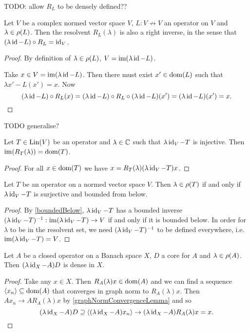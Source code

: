 TODO: allow $R_L$ to be densely defined??

\begin{lemma}
Let $V$ be a complex normed vector space $V$, $L: V\not\to V$ an operator on $V$ and $\lambda\in\rho(L)$. Then the resolvent $R_L(\lambda)$ is also a right inverse, in the sense that $(\lambda\operatorname{id} - L)\circ R_L = \operatorname{id}_V$.
\end{lemma}
\begin{proof}
By definition of $\lambda\in\rho(L)$, $V = \operatorname{im}(\lambda \operatorname{id} - L)$.

Take $x\in V = \operatorname{im}(\lambda \operatorname{id} - L)$. Then there must exist $x'\in \operatorname{dom}(L)$ such that $\lambda x' - L(x') = x$. Now
\[ (\lambda\operatorname{id} - L)\circ R_L(x) = (\lambda\operatorname{id} - L)\circ R_L \circ (\lambda\operatorname{id} - L) (x') = (\lambda\operatorname{id} - L)(x') = x. \]
\end{proof}
TODO generalise?

\begin{lemma}
Let $T\in\operatorname{Lin}(V)$ be an operator and $\lambda\in\mathbb{C}$ such that $\lambda\operatorname{id}_V - T$ is injective. Then $\operatorname{im}(R_T(\lambda)) = \operatorname{dom}(T)$.
\end{lemma}
\begin{proof}
For all $x\in \operatorname{dom}(T)$ we have $x = R_T(\lambda)(\lambda\operatorname{id}_V - T)x$.
\end{proof}

\begin{lemma} \label{elementResolventSetNormedSpace}
Let $T$ be an operator on a normed vector space $V$. Then $\lambda \in \rho(T)$ \textup{if and only if} $\lambda \operatorname{id}_V - T$ is surjective and bounded from below.
\end{lemma}
\begin{proof}
By \ref{boundedBelow}, $\lambda \operatorname{id}_V - T$ has a bounded inverse $(\lambda \operatorname{id}_V - T)^{-1}: \operatorname{im}(\lambda \operatorname{id}_V - T)\to V$ if and only if it is bounded below. In order for $\lambda$ to be in the resolvent set, we need $(\lambda \operatorname{id}_V - T)^{-1}$ to be defined everywhere, i.e. $\operatorname{im}(\lambda \operatorname{id}_V - T) = V$.
\end{proof}

\begin{lemma} \label{densityCoreLemma}
Let $A$ be a closed operator on a Banach space $X$, $D$ a core for $A$ and $\lambda\in\rho(A)$. Then $(\lambda\operatorname{id}_X - A)D$ is dense in $X$.
\end{lemma}
\begin{proof}
Take any $x\in X$. Then $R_A(\lambda)x\in \operatorname{dom}(A)$ and we can find a sequence $\left\langle x_n \right\rangle\subseteq \operatorname{dom}(A)$ that converges in graph norm to $R_A(\lambda)x$. Then $Ax_n \to AR_A(\lambda)x$ by \ref{graphNormConvergenceLemma} and so
\[ (\lambda\operatorname{id}_X - A)D \supseteq \left\langle (\lambda\operatorname{id}_X - A)x_n \right\rangle \to (\lambda\operatorname{id}_X - A)R_A(\lambda)x = x. \]
\end{proof}

